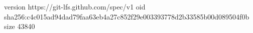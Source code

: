 version https://git-lfs.github.com/spec/v1
oid sha256:c4c015ad94dad79faa63eb4a27c852f29e003393778d2b33585b00d089504f0b
size 43840

